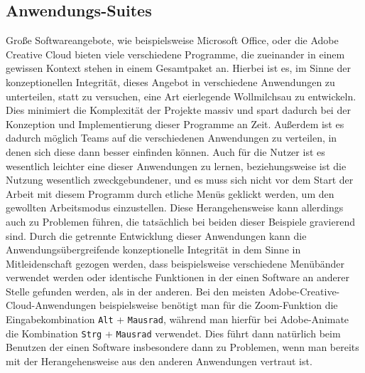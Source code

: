 \documentclass[a4paper, ngerman, 12pt, usenames, dvipsnames]{article}
\begin{document}
\subsection{Anwendungs-Suites}
Große Softwareangebote, wie beispielsweise Microsoft Office, oder die Adobe Creative Cloud bieten viele verschiedene Programme, die zueinander in einem gewissen Kontext stehen in einem Gesamtpaket an. Hierbei ist es, im Sinne der konzeptionellen Integrität, dieses Angebot in verschiedene Anwendungen zu unterteilen, statt zu versuchen, eine Art eierlegende Wollmilchsau zu entwickeln. Dies minimiert die Komplexität der Projekte massiv und spart dadurch bei der Konzeption und Implementierung dieser Programme an Zeit. Außerdem ist es dadurch möglich Teams auf die verschiedenen Anwendungen zu verteilen, in denen sich diese dann besser einfinden können. Auch für die Nutzer ist es wesentlich leichter eine dieser Anwendungen zu lernen, beziehungsweise ist die Nutzung wesentlich zweckgebundener, und es muss sich nicht vor dem Start der Arbeit mit diesem Programm durch etliche Menüs geklickt werden, um den gewollten Arbeitsmodus einzustellen. Diese Herangehensweise kann allerdings auch zu Problemen führen, die tatsächlich bei beiden dieser Beispiele gravierend sind. Durch die getrennte Entwicklung dieser Anwendungen kann die Anwendungsübergreifende konzeptionelle Integrität in dem Sinne in Mitleidenschaft gezogen werden, dass beispielsweise verschiedene Menübänder verwendet werden oder identische Funktionen in der einen Software an anderer Stelle gefunden werden, als in der anderen. Bei den meisten Adobe-Creative-Cloud-Anwendungen beispielsweise benötigt man für die Zoom-Funktion die Eingabekombination \texttt{Alt} + \texttt{Mausrad}, während man hierfür bei Adobe-Animate die Kombination \texttt{Strg} + \texttt{Mausrad} verwendet. Dies führt dann natürlich beim Benutzen der einen Software insbesondere dann zu Problemen, wenn man bereits mit der Herangehensweise aus den anderen Anwendungen vertraut ist.
\end{document}
